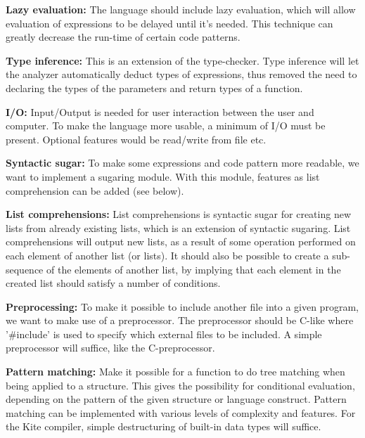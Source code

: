 \textbf{Lazy evaluation:}
The language should include lazy evaluation, which will allow evaluation of expressions to be delayed until it's needed. This technique can greatly decrease the run-time of certain code patterns.

\textbf{Type inference:}
This is an extension of the type-checker. Type inference will let the analyzer automatically deduct types of expressions, thus removed the need to declaring the types of the parameters and return types of a function.

\textbf{I/O:}
Input/Output is needed for user interaction between the user and computer. To make the language more usable, a minimum of I/O must be present. Optional features would be read/write from file etc.

\textbf{Syntactic sugar:}
To make some expressions and code pattern more readable, we want to implement a sugaring module. With this module, features as list comprehension can be added (see below).

\textbf{List comprehensions:}
List comprehensions is syntactic sugar for creating new lists from already existing lists, which is an extension of syntactic sugaring. List comprehensions will output new lists, as a result of some operation performed on each element of another list (or lists). It should also be possible to create a sub-sequence of the elements of another list, by implying that each element in the created list should satisfy a number of conditions.

\textbf{Preprocessing:}
To make it possible to include another file into a given program, we want to make use of a preprocessor. The preprocessor should be C-like where '\#include' is used to specify which external files to be included. A simple preprocessor will suffice, like the C-preprocessor.

\textbf{Pattern matching:}
Make it possible for a function to do tree matching when being applied to a structure. This gives the possibility for conditional evaluation, depending on the pattern of the given structure or language construct. Pattern matching can be implemented with various levels of complexity and features. For the Kite compiler, simple destructuring of built-in data types will suffice.
